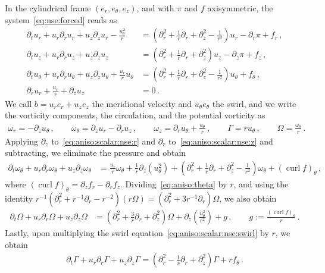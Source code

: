 \documentclass[11pt,reqno]{amsproc}
\numberwithin{equation}{section}
\theoremstyle{remark}
\newcommand{\p}{\partial}
\newcommand{\curl}{\operatorname{curl}}
\begin{document}
In the cylindrical frame $(e_r,e_\theta,e_z)$, and with $\pi$ and $f$ axisymmetric, the system~\eqref{eq:nse:forced} reads as
\begin{subequations}
\label{eq:aniso:scalar:nse}
\begin{align}
\p_tu_r+u_r\p_ru_r+u_z\p_zu_r-\frac{u_\theta^2}{r}
&=\left(\p_r^2+\frac1r\p_r+\p_z^2-\frac1{r^2}\right)u_r-\p_r\pi+f_r\,,
\label{eq:aniso:scalar:nse:r}
\\
\p_tu_z+u_r\p_ru_z+u_z\p_zu_z
&=\left(\p_r^2+\frac1r\p_r+\p_z^2\right)u_z-\p_z\pi+f_z\,,
\label{eq:aniso:scalar:nse:z}
\\
\p_tu_\theta+u_r\p_ru_\theta+u_z\p_zu_\theta+\frac{u_r}{r}u_\theta
&=\left(\p_r^2+\frac1r\p_r+\p_z^2-\frac1{r^2}\right)u_\theta+f_\theta\,,
\label{eq:aniso:scalar:nse:swirl}
\\
\p_ru_r+\frac{u_r}{r}+\p_zu_z&=0
\,.
\label{eq:aniso:scalar:nse:div}
\end{align}
\end{subequations}
We call $b=u_re_r+u_ze_z$ the meridional velocity and $u_\theta e_\theta$ the swirl, and we write the vorticity components, the circulation, and the potential vorticity as
\begin{align}
\omega_r=-\p_z u_\theta\,,\qquad
\omega_\theta=\p_z u_r-\p_r u_z\,,\qquad
\omega_z=\p_r u_\theta+\frac{u_\theta}{r}\,,\qquad
\Gamma=ru_\theta\,,\qquad \Omega=\frac{\omega_\theta}{r}
\,.
\label{eq:aniso:vorticity}
\end{align}
Applying $\p_z$ to~\eqref{eq:aniso:scalar:nse:r} and $\p_r$ to~\eqref{eq:aniso:scalar:nse:z} and subtracting, we eliminate the pressure and obtain
\begin{align}
\p_t\omega_\theta+u_r\p_r\omega_\theta+u_z\p_z\omega_\theta
&=\frac{u_r}{r}\omega_\theta+\frac1r\p_z(u_\theta^2)
+\left(\p_r^2+\frac1r\p_r+\p_z^2-\frac1{r^2}\right)\omega_\theta
+(\curl f)_\theta
\,,
\label{eq:aniso:theta}
\end{align}
where $(\curl f)_\theta=\p_zf_r-\p_rf_z$. Dividing~\eqref{eq:aniso:theta} by $r$, and using the identity $r^{-1}(\p_r^2+r^{-1}\p_r-r^{-2})(r\Omega)=(\p_r^2+3r^{-1}\p_r)\Omega$, we also obtain
\begin{align}
\p_t\Omega+u_r\p_r\Omega+u_z\p_z\Omega
&=\left(\p_r^2+\frac3r\p_r+\p_z^2\right)\Omega
+\p_z\left(\frac{u_\theta^2}{r^2}\right)
+g
\,,\qquad
g:=\frac{(\curl f)_\theta}{r}
\,.
\label{eq:aniso:q}
\end{align}
Lastly, upon multiplying the swirl equation~\eqref{eq:aniso:scalar:nse:swirl} by $r$, we obtain
\begin{align}
\p_t\Gamma+u_r\p_r\Gamma+u_z\p_z\Gamma
=\left(\p_r^2-\frac1r\p_r+\p_z^2\right)\Gamma
+rf_\theta
\,.
\label{eq:aniso:circulation:pde}
\end{align}
\end{document}
